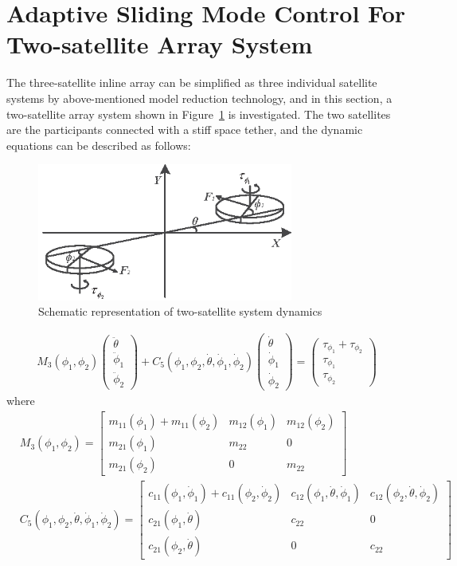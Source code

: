 \section{Adaptive Sliding Mode Control For Two-satellite Array System}\label{sec:SMC2}
The three-satellite inline array can be simplified as three individual satellite systems by above-mentioned model reduction technology, and in this section, a two-satellite array system shown in Figure~\ref{Figure:model2body} is investigated. The two satellites are the participants connected with a stiff space tether, and the dynamic equations can be described as follows:
\begin{figure}
\centering
\includegraphics[width=0.75\textwidth]{paper2_Fig4.eps}
\caption{Schematic representation of two-satellite system dynamics}
\label{Figure:model2body}
\end{figure}
\begin{align}
M_3(\phi_1,\phi_2)
\begin{pmatrix}
\ddot{\theta}\\
\ddot{\phi}_1\\
\ddot{\phi}_2
\end{pmatrix}
+C_5(\phi_1,\phi_2,\dot{\theta},\dot{\phi}_1,\dot{\phi}_2)
\begin{pmatrix}
\dot{\theta}\\
\dot{\phi}_1\\
\dot{\phi}_2
\end{pmatrix}
=
\begin{pmatrix}
\tau_{\phi_1}+\tau_{\phi_2}\\
\tau_{\phi_1}\\
\tau_{\phi_2}
\end{pmatrix}\label{eq:2body}
\end{align}
where
\begin{align}
&M_3(\phi_1,\phi_2)
=\begin{bmatrix}
m_{11}(\phi_1)+m_{11}(\phi_2) &m_{12}(\phi_1) &m_{12}(\phi_2)\\
m_{21}(\phi_1) &m_{22} &0\\
m_{21}(\phi_2) &0      &m_{22}
\end{bmatrix}\label{eq:M3}\\
&C_5(\phi_1,\phi_2,\dot{\theta},\dot{\phi}_1,\dot{\phi}_2)
=\begin{bmatrix}
c_{11}(\phi_1,\dot{\phi}_1)+c_{11}(\phi_2,\dot{\phi}_2) &c_{12}(\phi_1,\dot{\theta},\dot{\phi}_1) &c_{12}(\phi_2,\dot{\theta},\dot{\phi}_2)\\
c_{21}(\phi_1,\dot{\theta}) &c_{22} &0\\
c_{21}(\phi_2,\dot{\theta}) &0 &c_{22}
\end{bmatrix}\label{eq:C5}
\end{align}

